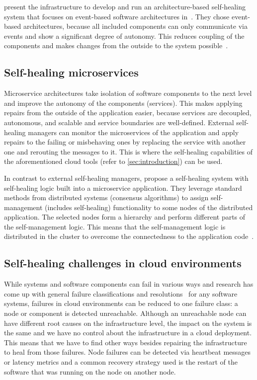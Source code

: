   \citeauthor{DashofyArchitecture} present the infrastructure to develop and run an architecture-based self-healing system that focuses on event-based software architectures in~\cite{DashofyArchitecture}.
  They chose event-based architectures, because all included components can only communicate via events and show a significant degree of autonomy.
  This reduces coupling of the components and makes changes from the outside to the system possible~\cite{DashofyArchitecture}.

\subsection{Self-healing microservices}
  Microservice architectures take isolation of software components to the next level and improve the autonomy of the components (services).
  This makes applying repairs from the outside of the application easier, because services are decoupled, autonomous, and scalable and service boundaries are well-defined.
  External self-healing managers can monitor the microservices of the application and apply repairs to the failing or misbehaving ones by replacing the service with another one and rerouting the messages to it.
  This is where the self-healing capabilities of the aforementioned cloud tools (refer to \cref{sec:introduction}) can be used.

  In contrast to external self-healing managers, \citeauthor{ToffettiMicroservices} propose a self-healing system with self-healing logic built into a microservice application.
  They leverage standard methods from distributed systems (\ie consensus algorithms) to assign self-management (includes self-healing) functionality to some nodes of the distributed application.
  The selected nodes form a hierarchy and perform different parts of the self-management logic.
  This means that the self-management logic is distributed in the cluster to overcome the connectedness to the application code~\cite{ToffettiMicroservices}.

\subsection{Self-healing challenges in cloud environments}
  While systems and software components can fail in various ways and research has come up with general failure classifications and resolutions~\cite[Tab.~1]{PsaierSurvey} for any software systems, failures in cloud environments can be reduced to one failure class: a node or component is detected unreachable.
  Although an unreachable node can have different root causes on the infrastructure level, the impact on the system is the same and we have no control about the infrastructure in a cloud deployment.
  This means that we have to find other ways besides repairing the infrastructure to heal from those failures.
  Node failures can be detected via heartbeat messages or latency metrics and a common recovery strategy used is the restart of the software that was running on the node on another node.

